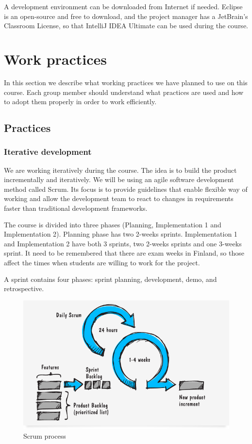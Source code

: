A development environment can be downloaded from Internet if needed. Eclipse is 
an open-source and free to download, and the project manager has a JetBrain's 
Classroom License, so that IntelliJ IDEA Ultimate can be used during the course.

\section{Work practices}

In this section we describe what working practices we have planned to use on this course. Each group member should understand what practices are used and how to adopt them properly in order to work efficiently.

\subsection{Practices}
\subsubsection{Iterative development}

We are working iteratively during the course. The idea is to build the product 
incrementally and iteratively. We will be using an agile software development 
method called Scrum. Its focus is to provide guidelines that enable flexible 
way of working and allow the development team to react to changes in 
requirements faster than traditional development frameworks.

The course is divided into three phases (Planning, Implementation 1 and 
Implementation 2). Planning phase has two 2-weeks sprints. Implementation 1 and 
Implementation 2 have both 3 sprints, two 2-weeks sprints and one 3-weeks 
sprint. It need to be remembered that there are exam weeks in Finland, so those 
affect the times when students are willing to work for the project.

A sprint contains four phases: sprint planning, development, demo, and 
retrospective. 

\begin{figure}[H]
\centering
\includegraphics[width=1\textwidth]{imgs/scrum_process_en.png}
\caption{Scrum process}
\label{fig:scrum}
\end{figure}

